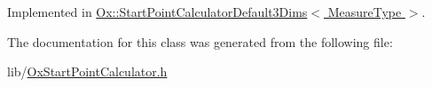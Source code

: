 Implemented in \hyperlink{class_ox_1_1_start_point_calculator_default3_dims_ad2d60ec81810eb5b0368834e15d031bd}{Ox\-::\-Start\-Point\-Calculator\-Default3\-Dims$<$ Measure\-Type $>$}.



The documentation for this class was generated from the following file\-:\begin{DoxyCompactItemize}
\item 
lib/\hyperlink{_ox_start_point_calculator_8h}{Ox\-Start\-Point\-Calculator.\-h}\end{DoxyCompactItemize}
